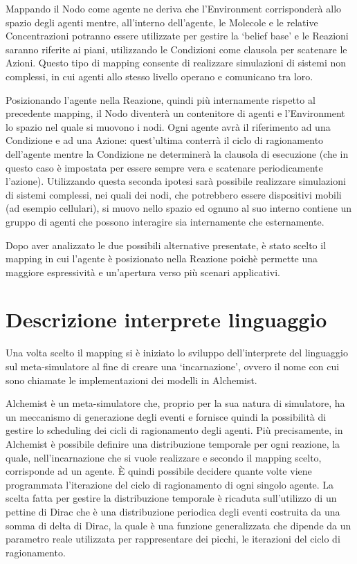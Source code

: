 Mappando il Nodo come agente ne deriva che l'Environment corrisponderà allo spazio degli agenti mentre, all'interno dell'agente, le Molecole e le relative Concentrazioni potranno essere utilizzate per gestire la `belief base' e le Reazioni saranno riferite ai piani, utilizzando le Condizioni come clausola per scatenare le Azioni. Questo tipo di mapping consente di realizzare simulazioni di sistemi non complessi, in cui agenti allo stesso livello operano e comunicano tra loro.

Posizionando l'agente nella Reazione, quindi più internamente rispetto al precedente mapping, il Nodo diventerà un contenitore di agenti e l'Environment lo spazio nel quale si muovono i nodi. Ogni agente avrà il riferimento ad una Condizione e ad una Azione: quest'ultima conterrà il ciclo di ragionamento dell'agente mentre la Condizione ne determinerà la clausola di esecuzione (che in questo caso è impostata per essere sempre vera e scatenare periodicamente l'azione). Utilizzando questa seconda ipotesi sarà possibile realizzare simulazioni di sistemi complessi, nei quali dei nodi, che potrebbero essere dispositivi mobili (ad esempio cellulari), si muovo nello spazio ed ognuno al suo interno contiene un gruppo di agenti che possono interagire sia internamente che esternamente.

Dopo aver analizzato le due possibili alternative presentate, è stato scelto il mapping in cui l'agente è posizionato nella Reazione poichè permette una maggiore espressività e un'apertura verso più scenari applicativi.

\section{Descrizione interprete linguaggio}\label{sctn:interpreteLinguaggio}
Una volta scelto il mapping si è iniziato lo sviluppo dell'interprete del linguaggio sul meta-simulatore al fine di creare una `incarnazione', ovvero il nome con cui sono chiamate le implementazioni dei modelli in Alchemist.

Alchemist è un meta-simulatore che, proprio per la sua natura di simulatore, ha un meccanismo di generazione degli eventi e fornisce quindi la possibilità di gestire lo scheduling dei cicli di ragionamento degli agenti. Più precisamente, in Alchemist è possibile definire una distribuzione temporale per ogni reazione, la quale, nell'incarnazione che si vuole realizzare e secondo il mapping scelto, corrisponde ad un agente. \`E quindi possibile decidere quante volte viene programmata l'iterazione del ciclo di ragionamento di ogni singolo agente. La scelta fatta per gestire la distribuzione temporale è ricaduta sull'utilizzo di un pettine di Dirac che è una distribuzione periodica degli eventi costruita da una somma di delta di Dirac, la quale è una funzione generalizzata che dipende da un parametro reale utilizzata per rappresentare dei picchi, le iterazioni del ciclo di ragionamento.

